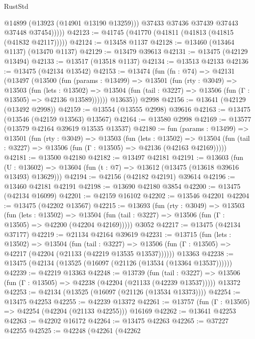 \begin{lexlean}{RustStd}
\begin{coremodule}
                @14899
                (@13923 (@14901 @13190 @13259)))
              @37433
              @37436
              @37439
              @37443
              @37448
              @37454)))))
@42123 := @41745 (@41770 (@41811 (@41813 (@41815 (@41832 @42117)))))
@42124 := @13458 @1137
@42128 := @13460 (@13464 @1137) (@13470 @1137)
@42129 := @13479 @39613
@42131 := @13475 (@42129 @13494)
@42133 := @13517 (@13518 @1137)
@42134 := @13513 @42133
@42136 := @13475 (@42134 @13542)
@42153 := @13474
    (fun (fn : @74) =>
    @42131
      (@13497
        (@13500
          (fun (params : @13499) =>
          @13501
            (fun (rty : @3049) =>
            @13503
              (fun (lets : @13502) =>
              @13504 (fun (tail : @3227) => @13506 (fun (Γ : @13505) => @42136 @13589))))))
        @13635))
    @2998
@42156 := @13641 (@42129 (@13492 @2998))
@42159 := @13554 (@13555 @2998) @39616
@42163 := @13475 (@13546 (@42159 @13563) @13567)
@42164 := @13580 @2998
@42169 := @13577 (@13579 @42164 @39619 @13535 @13537)
@42180 := fun (params : @13499) =>
  @13501
    (fun (rty : @3049) =>
    @13503
      (fun (lets : @13502) =>
      @13504 (fun (tail : @3227) => @13506 (fun (Γ : @13505) => @42136 (@42163 @42169)))))
@42181 := @13500 @42180
@42182 := @13497 @42181
@42191 := @13603
    (fun (U : @13602) => @13604 (fun (t : @7) => @13612 (@13475 (@13618 @39616 @13493) @13629)))
@42194 := @42156 (@42182 @42191) @39614
@42196 := @13460 @42181 @42191
@42198 := @13690 @42180 @3854
@42200 := @13475 (@42134 @16099)
@42201 := @42159 @16102
@42202 := @13546 @42201
@42204 := @13475 (@42202 @13567)
@42215 := @13693
    (fun (rty : @3049) =>
    @13503
      (fun (lets : @13502) =>
      @13504 (fun (tail : @3227) => @13506 (fun (Γ : @13505) => @42200 (@42204 @42169)))))
    @3052
@42217 := @13475 (@42134 @37177)
@42219 := @21134 @42164 @39619
@42231 := @13715
    (fun (lets : @13502) =>
    @13504
      (fun (tail : @3227) =>
      @13506 (fun (Γ : @13505) => @42217 (@42204 (@21133 (@42219 @13535 @13537))))))
    @13363
@42238 := @13475 (@42134 (@13525 (@16097 (@21126 (@13534 (@13364 @13537))))))
@42239 := @42219 @13363
@42248 := @13739
    (fun (tail : @3227) => @13506 (fun (Γ : @13505) => @42238 (@42204 (@21133 (@42239 @13537)))))
    @13372
@42253 := @42134 (@13525 (@16097 (@21126 (@13534 @13373))))
@42254 := @13475 @42253
@42255 := @42239 @13372
@42261 := @13757 (fun (Γ : @13505) => @42254 (@42204 (@21133 @42255))) @16169
@42262 := @13641 @42253
@42263 := @42202 @16172
@42264 := @13475 @42263
@42265 := @37227 @42255
@42525 := @42248
    (@42261
      (@42262

\end{coremodule}
\end{lexlean}

